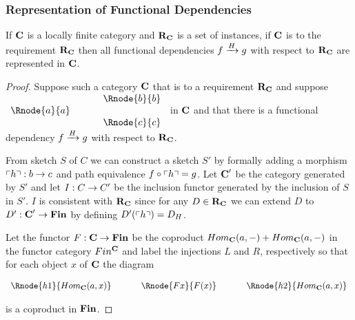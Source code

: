 \subsubsection{Representation of Functional Dependencies}
\begin{lemma}
If $\catc$ is a locally finite category and $\reqtc$ is a set of instances, if $\catc$ is 
 to the requirement $\reqtc$ then
all functional dependencies $\fundep{H}{f}{g}$  with respect to $\reqtc$ are represented in $\catc$.
\end{lemma}
\begin{proof}
Suppose such a category  $\catc$  that  is 
 to a requirement $\reqtc$ and suppose
$
\begin{array}{c p{0.5cm} c  }
             &&   \Rnode{b}{b} \\[0.01cm]
\Rnode{a}{a} &&                \\[0.01cm] 
             &&   \Rnode{c}{c}         
\end{array} 
$
in $\catc$ 
and that there is a functional dependency $\fundep{H}{f}{g}$ with respect to $\reqtc$.

From sketch $S$ of $C$ we can construct a sketch $S'$ by formally adding a morphism $\qq{h}: b \morph c$
and path equivalence $f \circ \qq{h} = g$. Let $\catcp$ be the category generated by $S'$ and
let $I: C \morph C'$ be the inclusion functor generated by the inclusion of $S$ in $S'$. 
$I$ is consistent with $\reqtc$ since for any $D \in \reqtc$ we can extend $D$ to $D' :\catcp \morph \Fin$ by defining $D'(\qq{h})=D_H$.

Let the functor $F: \catc \morph \Fin$ be the coproduct $Hom_{\catc}(a,-) + Hom_{\catc}(a,-)$
in the functor category $Fin^{\catc}$ and label the injections $L$ and $R$, respectively so that
for each object $x$ of $\catc$ the diagram
\begin{center}
$
\begin{array}{c p{0.5cm} c p{0.5cm} c  }
\Rnode{h1}{Hom_{\catc}(a,x)}  &&\Rnode{Fx}{F(x)}  &&   \Rnode{h2}{Hom_{\catc}(a,x)}       
\end{array} 
$
\end{center}
is a coproduct in $\Fin$.


\end{proof}
